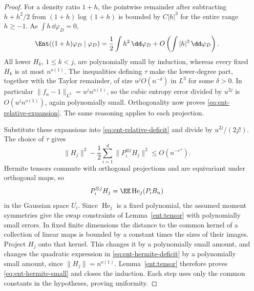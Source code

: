 \begin{proof}
For a density ratio \(1+h\), the pointwise remainder after
subtracting \(h+h^2/2\) from \((1+h)\log(1+h)\) is
bounded by \(C|h|^3\) for the entire range \(h\ge-1\).
As \(\int h\,\dd\varphi_D=0\),
\[
 \Ent((1+h)\varphi_D\mid\varphi_D)
 =\frac12\int h^2\,\dd\varphi_D
       +O\left(\int|h|^3\,\dd\varphi_D\right).
\]
All lower \(H_k\), \(1\le k<j\), are polynomially small by
induction, whereas every fixed \(H_k\) is at most \(n^{o(1)}\).
The inequalities defining \(\tau\) make the lower-degree part,
together with the Taylor remainder, of size
\(u^j O(n^{-\delta})\) in \(L^3\) for some \(\delta>0\).
In particular \(\|f_u-1\|_{L^3}=u^j n^{o(1)}\), so the cubic
entropy error divided by \(u^{2j}\) is
\(O(u^j n^{o(1)})\), again polynomially small. Orthogonality
now proves \eqref{eq:ent-relative-expansion}. The same reasoning
applies to each projection.

Substitute these expansions into \eqref{eq:ent-relative-deficit}
and divide by \(u^{2j}/(2j!)\). The choice of \(\tau\) gives
\begin{equation}\label{eq:ent-hermite-deficit}
 \|H_j\|^2-\frac12\sum_{i=1}^d
              \|P_i^{\otimes j}H_j\|^2
 \le O(n^{-c''}).
\end{equation}
Hermite tensors commute with orthogonal projections and are
equivariant under orthogonal maps, so
\[
 P_i^{\otimes j}H_j
 =\EE\operatorname{He}_j(P_iB_n)
\]
in the Gaussian space \(U_i\). Since \(\operatorname{He}_j\) is a
fixed polynomial, the assumed moment symmetries give the swap
constraints of Lemma~\ref{ent:tensor} with polynomially small errors.
In fixed finite dimensions the distance to the common kernel of a
collection of linear maps is bounded by a constant times the sizes
of their images. Project \(H_j\) onto that kernel. This changes it
by a polynomially small amount, and changes the quadratic expression
in \eqref{eq:ent-hermite-deficit} by a polynomially small amount,
since \(\|H_j\|=n^{o(1)}\). Lemma~\ref{ent:tensor} therefore proves
\eqref{eq:ent-hermite-small} and closes the induction. Each step uses
only the common constants in the hypotheses, proving uniformity.
\end{proof}

